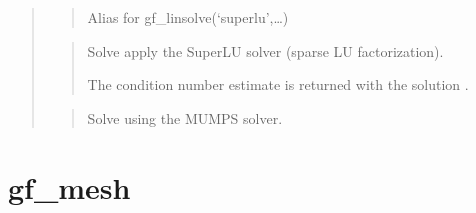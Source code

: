 \documentclass[a4paper,11pt,english]{sphinxmanual}
\begin{document}
\begin{quote}
\begin{quote}
\sphinxAtStartPar
Alias for gf\_linsolve(‘superlu’,…)
\end{quote}

\sphinxAtStartPar
{}
\begin{quote}

\sphinxAtStartPar
Solve  apply the SuperLU solver (sparse LU factorization).

\sphinxAtStartPar
The condition number estimate  is returned with the solution .
\end{quote}

\sphinxAtStartPar
{}
\begin{quote}

\sphinxAtStartPar
Solve  using the MUMPS solver.
\end{quote}
\end{quote}


\section{gf\_mesh}
\label{\detokenize{matlab_octave/cmdref_gf_mesh:gf-mesh}}\label{\detokenize{matlab_octave/cmdref_gf_mesh::doc}}
\sphinxAtStartPar
{}
\end{document}
